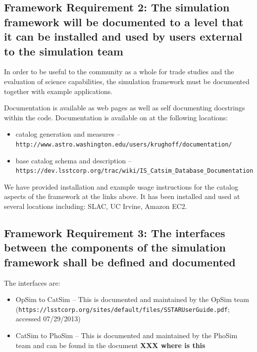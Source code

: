 \documentclass[]{article}
\begin{document}
{\subsection{Framework Requirement 2: The simulation framework will be documented to a level
  that it can be installed and used by users external to the
  simulation team}
In order to be useful to the community as a whole for trade studies and the evaluation of science 
capabilities, the simulation framework must be documented together with example applications.  

Documentation is available as web pages as well as self documenting docstrings within the code.  Documentation
is available on
at the following locations:
\begin{itemize}
\item catalog generation and measures -- {\tt http://www.astro.washington.edu/users/krughoff/documentation/}
\item base catalog schema and description -- {\tt https://dev.lsstcorp.org/trac/wiki/IS\_Catsim\_Database\_Documentation}
\end{itemize}

We have provided installation and example usage instructions for the catalog 
aspects of the framework at the links above.  
It has been installed and used at several locations 
including: SLAC, UC Irvine, Amazon EC2.

\subsection{Framework Requirement 3: The interfaces between the components of the simulation framework shall be defined 
and documented}
The interfaces are:
\begin{itemize}
\item OpSim to CatSim -- This is documented and maintained by the OpSim team 
({\tt https://lsstcorp.org/sites/default/files/SSTARUserGuide.pdf}; accessed 07/29/2013)
\item CatSim to PhoSim -- This is documented and maintained by the PhoSim team and can be found in the document
{\bf XXX where is this}
\end{itemize}

}
\end{document}
